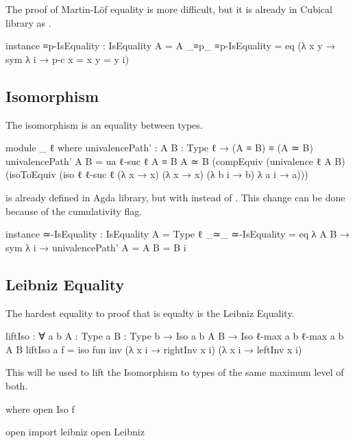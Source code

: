 \documentclass{article}
\begin{document}
The proof of Martin-Löf equality is more difficult, but it is already in Cubical library as .

\begin{code}
  instance
    ≡p-IsEquality : IsEquality {A = A} _≡p_
    ≡p-IsEquality = eq (λ {x y} → sym λ i → p-c {x = x} {y = y} i)
\end{code}

\subsection{Isomorphism}

The isomorphism is an equality between types.

\begin{code}
module _ {ℓ} where
  univalencePath' : {A B : Type ℓ} → (A ≡ B) ≡ (A ≃ B)
  univalencePath' {A} {B} =
    ua {ℓ-suc ℓ} {A ≡ B} {A ≃ B} (compEquiv (univalence {ℓ} {A} {B})
    (isoToEquiv (iso {ℓ} {ℓ-suc ℓ}
    (λ x → x) (λ x → x) (λ b i → b) λ a i → a)))
\end{code}

 is already defined in Agda library, but with  instead of
. This change can be done because of the cumulativity flag.

\begin{code}
  instance
    ≃-IsEquality : IsEquality
      {A = Type ℓ} _≃_
    ≃-IsEquality = eq λ {A B} → sym
      λ i → univalencePath' {A = A} {B = B} i
\end{code}

\subsection{Leibniz Equality}

The hardest equality to proof that is equalty is the Leibniz Equality.

\begin{code}
liftIso : ∀ {a b} {A : Type a} {B : Type b}
  → Iso {a} {b} A B → Iso {ℓ-max a b} {ℓ-max a b} A B
liftIso {a} f = iso fun inv
  (λ x i → rightInv x i) (λ x i → leftInv x i)
\end{code}

This  will be used to lift the Isomorphism to types of the same maximum level of both.

\begin{code}
  where open Iso f

open import leibniz
open Leibniz
\end{code}
\end{document}
